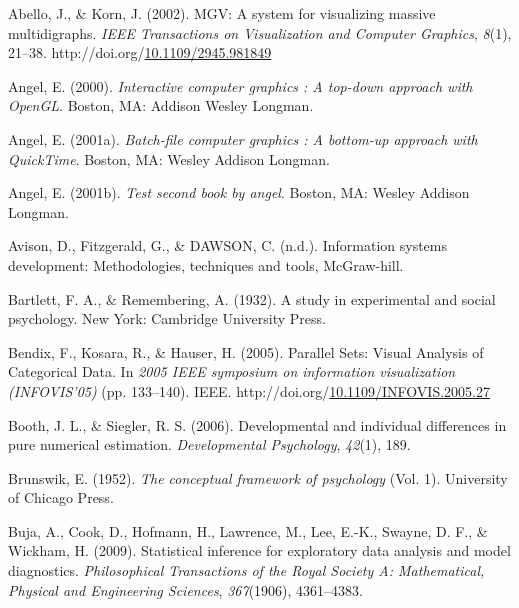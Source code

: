 \documentclass[print]{nuthesis}
\newlength{\cslhangindent}
\newenvironment{CSLReferences}[2]%
{\setlength{\parindent}{0pt}%
\everypar{\setlength{\hangindent}{\cslhangindent}}\ignorespaces}%
{\par}
\begin{document}
\hypertarget{refs}{}
\begin{CSLReferences}{1}{0}
\leavevmode\hypertarget{ref-abello2002}{}%
Abello, J., \& Korn, J. (2002). MGV: A system for visualizing massive multidigraphs. \emph{IEEE Transactions on Visualization and Computer Graphics}, \emph{8}(1), 21--38. http://doi.org/\href{https://doi.org/10.1109/2945.981849}{10.1109/2945.981849}

\leavevmode\hypertarget{ref-angel2000}{}%
Angel, E. (2000). \emph{Interactive computer graphics : A top-down approach with OpenGL}. Boston, MA: Addison Wesley Longman.

\leavevmode\hypertarget{ref-angel2001}{}%
Angel, E. (2001a). \emph{Batch-file computer graphics : A bottom-up approach with QuickTime}. Boston, MA: Wesley Addison Longman.

\leavevmode\hypertarget{ref-angel2002a}{}%
Angel, E. (2001b). \emph{Test second book by angel}. Boston, MA: Wesley Addison Longman.

\leavevmode\hypertarget{ref-avison1995}{}%
Avison, D., Fitzgerald, G., \& DAWSON, C. (n.d.). Information systems development: Methodologies, techniques and tools, McGraw-hill.

\leavevmode\hypertarget{ref-bartlett1932}{}%
Bartlett, F. A., \& Remembering, A. (1932). A study in experimental and social psychology. New York: Cambridge University Press.

\leavevmode\hypertarget{ref-Bendix:2005}{}%
Bendix, F., Kosara, R., \& Hauser, H. (2005). {Parallel Sets: Visual Analysis of Categorical Data}. In \emph{2005 IEEE symposium on information visualization (INFOVIS'05)} (pp. 133--140). IEEE. http://doi.org/\href{https://doi.org/10.1109/INFOVIS.2005.27}{10.1109/INFOVIS.2005.27}

\leavevmode\hypertarget{ref-booth2006}{}%
Booth, J. L., \& Siegler, R. S. (2006). Developmental and individual differences in pure numerical estimation. \emph{Developmental Psychology}, \emph{42}(1), 189.

\leavevmode\hypertarget{ref-brunswik1952}{}%
Brunswik, E. (1952). \emph{The conceptual framework of psychology} (Vol. 1). University of Chicago Press.

\leavevmode\hypertarget{ref-buja2009}{}%
Buja, A., Cook, D., Hofmann, H., Lawrence, M., Lee, E.-K., Swayne, D. F., \& Wickham, H. (2009). Statistical inference for exploratory data analysis and model diagnostics. \emph{Philosophical Transactions of the Royal Society A: Mathematical, Physical and Engineering Sciences}, \emph{367}(1906), 4361--4383.


\end{CSLReferences}
\end{document}
